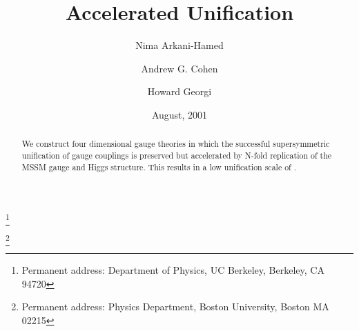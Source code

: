 \documentclass[a4paper,prl,twocolumn]{revtex4}
\begin{document}

\title{Accelerated Unification}


\author{Nima Arkani-Hamed}
 \thanks{Permanent address: Department of Physics, UC Berkeley, Berkeley,
   CA 94720}
\author{Andrew G. Cohen}%
\thanks{Permanent address: Physics Department, Boston University,
  Boston MA 02215} 
\author{Howard Georgi}

\date{August, 2001}

\begin{abstract}
    We construct four dimensional
    gauge theories in which the successful supersymmetric unification
    of gauge couplings is preserved but accelerated by N-fold
    replication of the MSSM gauge and Higgs  structure. This results
    in a low  unification scale of \coordHE{}.  
\end{abstract}

\maketitle
\end{document}
